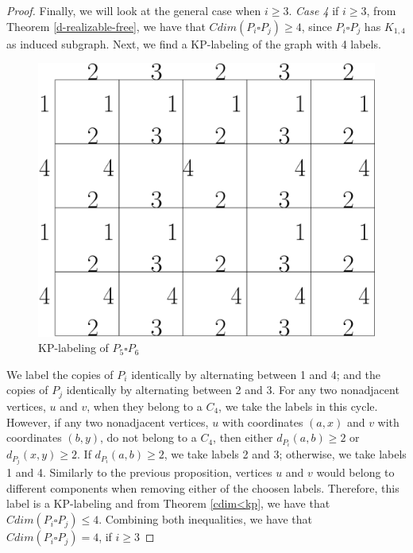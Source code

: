 \documentclass[12pt,a4paper,titlepage,openany]{report}
\begin{document}
\begin{proof}
Finally, we will look at the general case when $i\geq 3$.
\newline
\textit{Case 4} if $i\geq 3$, from Theorem \ref{d-realizable-free}, we have that $Cdim(P_i\square P_j)\geq 4$, since $P_i \square P_j$ has $K_{1,4}$ as induced subgraph.\newline
Next, we find a KP-labeling of the graph with 4 labels.
\begin{figure}[h]
\begin{center}
\includegraphics[width=0.6\linewidth]{figures/p_isqp_j.png}
\end{center}
\caption{KP-labeling of $P_5\square P_6$}
\end{figure}\newline
We label the copies of $P_i$ identically by alternating between 1 and 4; and the copies of $P_j$ identically by alternating between 2 and 3.\newline
For any two nonadjacent vertices, $u$ and $v$, when they belong to a $C_4$, we take the labels in this cycle. However, if any two nonadjacent vertices, $u$ with coordinates $(a,x)$ and $v$ with coordinates $(b,y)$, do not belong to a $C_4$, then either $d_{P_i}(a,b) \geq 2$ or $d_{P_j}(x,y) \ge 2$. If $d_{P_i}(a,b) \geq 2$, we take labels 2 and 3; otherwise, we take labels 1 and 4. Similarly to the previous proposition, vertices $u$ and $v$ would belong to different components when removing either of the choosen labels. 
 \newline
Therefore, this label is a KP-labeling and from Theorem \ref{cdim<kp}, we have that $Cdim(P_i\square P_j)\leq 4$.\newline
Combining both inequalities, we have that $Cdim(P_i\square P_j)=4$, if $i\geq 3$
\end{proof}
\end{document}
